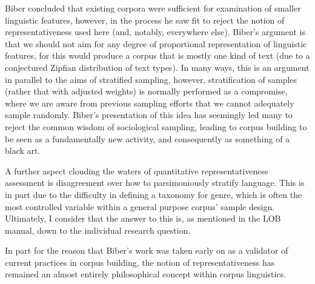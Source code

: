 
Biber concluded that existing corpora were sufficient for examination of smaller linguistic features, however, in the process he saw fit to reject the notion of representativeness used here (and, notably, everywhere else).  Biber's argument is that we should not aim for any degree of proportional representation of linguistic features, for this would produce a corpus that is mostly one kind of text (due to a conjectured Zipfian distribution of text types).  In many ways, this is an argument in parallel to the aims of stratified sampling, however, stratification of samples (rather that with adjusted weights) is normally performed as a compromise, where we are aware from previous sampling efforts that we cannot adequately sample randomly.  Biber's presentation of this idea has seemingly led many to reject the common wisdom of sociological sampling, leading to corpus building to be seen as a fundamentally new activity, and consequently as something of a black art.


A further aspect clouding the waters of quantitative representativeness assessment is disagreement over how to parsimoniously stratify language.  This is in part due to the difficulty in defining a taxonomy for genre, which is often the most controlled variable within a general purpose corpus' sample design.  Ultimately, I consider that the answer to this is, as mentioned in the LOB manual, down to the individual research question.



In part for the reason that Biber's work was taken early on as a validator of current practices in corpus building, the notion of representativeness has remained an almost entirely philosophical concept within corpus linguistics.%




